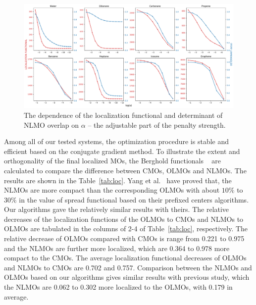 \documentclass[aps,prl,reprint,amsmath,amssymb]{revtex4-1}
\begin{document}

\begin{figure}[hbpt]
\centering
\includegraphics[width=\textwidth]{figure_2.pdf}
\caption{The dependence of the localization functional and determinant of NLMO overlap on $\alpha$ -- the adjustable part of the penalty strength.}
\label{fig:alpha}
\end{figure}


Among all of our tested systems, the optimization procedure is stable and efficient based on the conjugate gradient method. 
To illustrate the extent and orthogonality of the final localized MOs, the Berghold functionals ~\cite{berghold2000general}  are calculated to compare the difference between CMOs, OLMOs and NLMOs.
The results are shown in the Table~\ref{tab:loc}.
Yang et al.~\cite{feng2004An_efficient, cui2010efficient} have proved that, the NLMOs are more compact than the corresponding OLMOs with about $10\%$ to $30\%$ in the value of spread functional based on their prefixed centers algorithms.
Our algorithms gave the relatively similar results with theirs.
The relative decreases of the localization functions of the OLMOs to CMOs and NLMOs to OLMOs are tabulated in the columns of 2-4 of Table~\ref{tab:loc}, respectively.
The relative decrease of OLMOs compared with CMOs is range from 0.221 to 0.975 and the NLMOs are further  more localized, which are 0.364 to 0.978 more compact to the CMOs.
The average  localization functional decreases of OLMOs and NLMOs to CMOs are 0.702 and 0.757.
Comparison between the NLMOs and OLMOs based on our algorithms gives similar results with previous study, which the NLMOs are 0.062 to 0.302 more localized to the OLMOs, with 0.179 in average.
\end{document}
